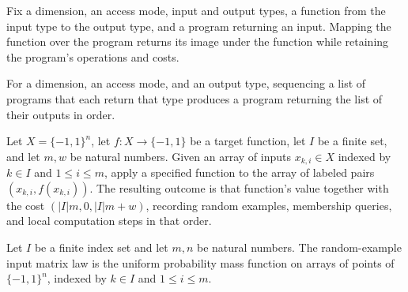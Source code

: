 \begin{definition}
\label{FABL.LearningProgram.map}
\leanok
{}
Fix a dimension, an access mode, input and output types, a function from the input type
to the output type, and a program returning an input. Mapping the function over the
program returns its image under the function while retaining the program's operations
and costs.
\end{definition}

\begin{definition}
\label{FABL.LearningProgram.sequence}
\leanok
{}
For a dimension, an access mode, and an output type, sequencing a list of programs that
each return that type produces a program returning the list of their outputs in order.
\end{definition}

\begin{definition}
\label{FABL.LearningProgram.randomExampleMatrixOutcome}
\leanok
{}
Let $X=\{-1,1\}^n$, let $f:X\to\{-1,1\}$ be a target function, let $I$ be a finite set,
and let $m,w$ be natural numbers. Given an array of inputs $x_{k,i}\in X$ indexed by
$k\in I$ and $1\leq i\leq m$, apply a specified function to the array of labeled pairs
$(x_{k,i},f(x_{k,i}))$. The resulting outcome is that function’s value together with the
cost $(|I|m,0,|I|m+w)$, recording random examples, membership queries, and local
computation steps in that order.
\end{definition}

\begin{definition}
\label{FABL.LearningProgram.randomExampleMatrixInputLaw}
\leanok
{}
Let $I$ be a finite index set and let $m,n$ be natural numbers. The random-example input
matrix law is the uniform probability mass function on arrays of points of $\{-1,1\}^n$,
indexed by $k\in I$ and $1\leq i\leq m$.
\end{definition}

